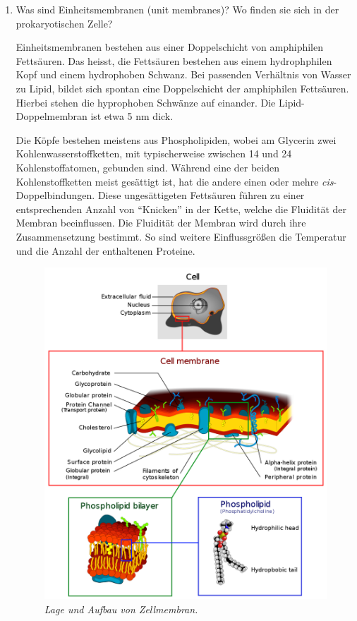 \begin{enumerate}
		\item Was sind Einheitsmembranen (unit membranes)? Wo finden sie sich in der prokaryotischen Zelle?

			Einheitsmembranen bestehen aus einer Doppelschicht von amphiphilen Fettsäuren.
			Das heisst, die Fettsäuren bestehen aus einem hydrophphilen Kopf und einem hydrophoben Schwanz.
			Bei passenden Verhältnis von Wasser zu Lipid, bildet sich spontan eine Doppelschicht der amphiphilen Fettsäuren.
			Hierbei stehen die hyprophoben Schwänze auf einander.
			Die Lipid-Doppelmembran ist etwa 5 nm dick.
		
			Die Köpfe bestehen meistens aus Phospholipiden,
			wobei am Glycerin zwei Kohlenwasserstoffketten,
			mit typischerweise zwischen 14 und 24 Kohlenstoffatomen,
			gebunden sind.
			Während eine der beiden Kohlenstoffketten meist gesättigt ist,
			hat die andere einen oder mehre \textit{cis}-Doppelbindungen.
			Diese ungesättigeten Fettsäuren führen zu einer entsprechenden Anzahl von ``Knicken'' in der Kette,
			welche die Fluidität der Membran beeinflussen.
			Die Fluidität der Membran wird durch ihre Zusammensetzung bestimmt.
			So sind weitere Einflussgrößen die Temperatur und
			die Anzahl der enthaltenen Proteine.

			\begin{figure}[ht!]
			\leavevmode
			\begin{center}
			\includegraphics[scale=0.36]{./pictures/cell_membrane_diag_1000}
			\end{center}
			\caption{\slshape{Lage und Aufbau von Zellmembran.}}
			\label{fig:cellmembrane}
			\end{figure}


\end{enumerate}
